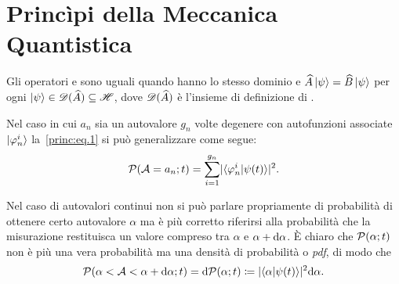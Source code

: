 \chapter{Princìpi della Meccanica Quantistica}
\label{chap:principi}



\noindent
Gli operatori  e  sono uguali quando hanno lo stesso dominio e $\widehat{A}\ket{\psi}=\widehat{B}\ket{\psi}$ per ogni $\ket{\psi}\in\mathscr{D}(\widehat{A})\subseteq\mathscr{H}$, dove $\mathscr{D}(\widehat{A})$ è l'insieme di definizione di .



\noindent
Nel caso in cui $a_n$ sia un autovalore $g_n$ volte degenere con autofunzioni associate $\ket{\varphi_n^i}$ la~\eqref{princ:eq.1} si può generalizzare come segue:
\begin{equation}
\mathcal{P}(\mathcal{A}=a_n;t)=\sum_{i=1}^{g_n}\lvert\braket{\varphi_n^i|\psi(t)}\rvert^2.
\end{equation}


Nel caso di autovalori continui non si può parlare propriamente di probabilità di ottenere certo autovalore $\alpha$ ma è più corretto riferirsi alla probabilità che la misurazione restituisca un valore compreso tra $\alpha$ e $\alpha+\mathop{}\!\mathrm{d}\alpha$.
È chiaro che $\mathcal{P}(\alpha;t)$ non è più una vera probabilità ma una densità di probabilità o \emph{\ac{pdf}}, di modo che
\begin{equation}
\mathcal{P}(\alpha<\mathcal{A}<\alpha+\mathop{}\!\mathrm{d}\alpha;t)=\mathop{}\!\mathrm{d}\mathcal{P}(\alpha;t)\coloneqq \lvert\braket{\alpha|\psi(t)}\rvert^2\!\mathop{}\!\mathrm{d}\alpha.
\end{equation}


